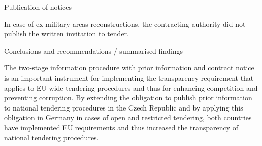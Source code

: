\documentclass[10pt]{article}
\begin{document}
Publication of notices

In case of ex-military areas reconstructions, the contracting authority did not publish the written invitation to tender.


Conclusions and recommendations / summarised findings

The two-stage information procedure with prior information and contract notice is an important instrument for implementing the transparency requirement that applies to EU-wide tendering procedures and thus for enhancing competition and preventing corruption.
By extending the obligation to publish prior information to national tendering procedures in the Czech Republic and by applying this obligation in Germany in cases of open and restricted tendering, both countries have implemented EU requirements and thus increased the transparency of national tendering procedures.
\end{document}
